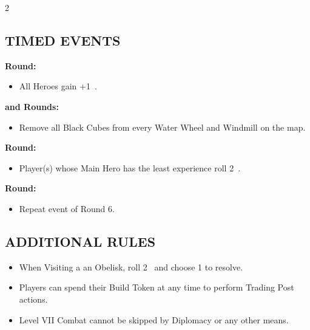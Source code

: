 \begin{multicols}{2}

\subsection*{\MakeUppercase{Timed Events}}

\textbf{ Round:}
\begin{itemize}
  \item All Heroes gain +1~.
\end{itemize}
\textbf{ and  Rounds:}
\begin{itemize}
  \item Remove all Black Cubes from every Water Wheel and Windmill on the map.
\end{itemize}
\textbf{ Round:}
\begin{itemize}
  \item Player(s) whose Main Hero has the least experience roll 2~.
\end{itemize}
\textbf{ Round:}
\begin{itemize}
  \item Repeat event of Round 6.
\end{itemize}

\columnbreak

\subsection*{\MakeUppercase{Additional Rules}}

\begin{itemize}
  \item When Visiting a an Obelisk, roll 2~ and choose 1 to resolve.
  \item Players can spend their Build Token at any time to perform Trading Post actions.
  \item Level VII Combat cannot be skipped by Diplomacy or any other means.
\end{itemize}

\vspace*{\fill}

\end{multicols}
